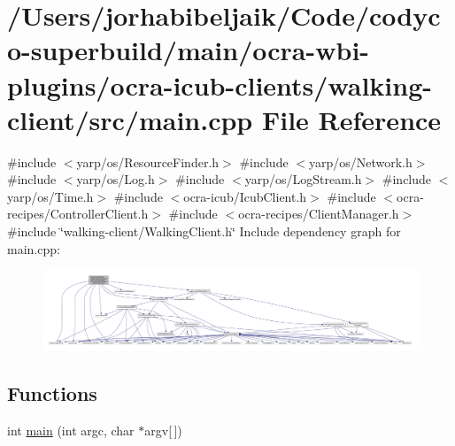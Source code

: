 \hypertarget{ocra-icub-clients_2walking-client_2src_2main_8cpp}{}\section{/\+Users/jorhabibeljaik/\+Code/codyco-\/superbuild/main/ocra-\/wbi-\/plugins/ocra-\/icub-\/clients/walking-\/client/src/main.cpp File Reference}
\label{ocra-icub-clients_2walking-client_2src_2main_8cpp}
{\ttfamily \#include $<$yarp/os/\+Resource\+Finder.\+h$>$}\newline
{\ttfamily \#include $<$yarp/os/\+Network.\+h$>$}\newline
{\ttfamily \#include $<$yarp/os/\+Log.\+h$>$}\newline
{\ttfamily \#include $<$yarp/os/\+Log\+Stream.\+h$>$}\newline
{\ttfamily \#include $<$yarp/os/\+Time.\+h$>$}\newline
{\ttfamily \#include $<$ocra-\/icub/\+Icub\+Client.\+h$>$}\newline
{\ttfamily \#include $<$ocra-\/recipes/\+Controller\+Client.\+h$>$}\newline
{\ttfamily \#include $<$ocra-\/recipes/\+Client\+Manager.\+h$>$}\newline
{\ttfamily \#include \char`\"{}walking-\/client/\+Walking\+Client.\+h\char`\"{}}\newline
Include dependency graph for main.\+cpp\+:
\nopagebreak
\begin{figure}[H]
\begin{center}
\leavevmode
\includegraphics[width=350pt]{ocra-icub-clients_2walking-client_2src_2main_8cpp__incl}
\end{center}
\end{figure}
\subsection*{Functions}
\begin{DoxyCompactItemize}
\item 
int \hyperlink{ocra-icub-clients_2walking-client_2src_2main_8cpp_a0ddf1224851353fc92bfbff6f499fa97}{main} (int argc, char $\ast$argv\mbox{[}$\,$\mbox{]})
\end{DoxyCompactItemize}


